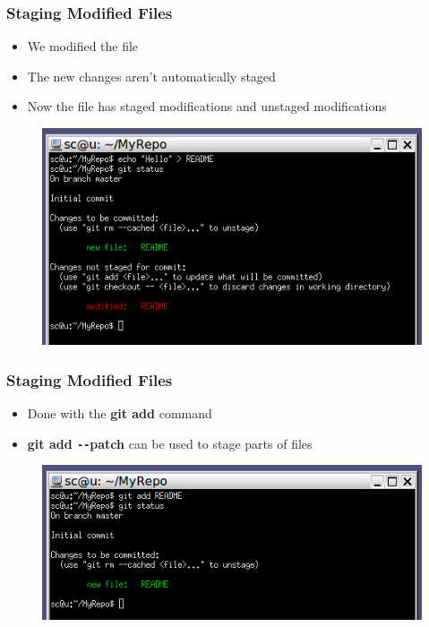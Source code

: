 \documentclass{beamer}
\begin{document}
\begin{frame}
	\frametitle{Staging Modified Files}
	\begin{itemize}
		\item{We modified the file}
		\item{The new changes aren't automatically staged}
		\item{Now the file has staged modifications and unstaged modifications}
	\end{itemize}
	\begin{figure}
		\includegraphics[scale=0.55]{Staging_Modified_Files-0.png}
	\end{figure}
\end{frame}

\begin{frame}
	\frametitle{Staging Modified Files}
	\begin{itemize}
		\item{Done with the \textbf{git add} command}
		\item{\textbf{git add \texttt{-{}-}patch} can be used to stage parts of files}
	\end{itemize}
	\begin{figure}
		\includegraphics[scale=0.60]{Staging_Modified_Files-1.png}
	\end{figure}
\end{frame}
\end{document}
